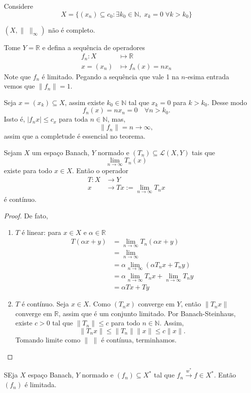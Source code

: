 \documentclass[portuguese]{article}
\theoremstyle{definition}
\newcommand{\R}{\mathbb{R}}
\newcommand{\N}{\mathbb{N}}
\begin{document}
	\begin{exemplo}
		Considere
		\[X=\{(x_n)\subseteq c_0:\exists k_0\in\N,\; x_k=0\;\forall k>k_0\}\]
		\begin{exer*}
			$(X,\|\;\|_\infty)$ não é completo.
		\end{exer*}
		Tome $Y=\R$ e defina a sequência de operadores
		\begin{align*}
			f_n:X&\mapsto\R\\
			x=(x_n)&\mapsto f_n(x)=nx_n
		\end{align*}
		Note que $f_n$ é limitado. Pegando a sequência que vale 1 na $n$-esima entrada vemos que $\| f_n\|=1$.
		
		Seja $x=(x_k)\subseteq X$, assim existe $k_0\in\N$ tal que $x_k=0$ para $k>k_0$. Desse modo
		\[f_n(x)=nx_n=0\quad\forall n>k_0.\]
		Issto é, $|f_nx|\leq c_x$ para toda $n\in\N$, mas,
		\[\| f_n\|=n\to\infty,\]
		assim que a completude é essencial no teorema.
	\end{exemplo}
	\begin{coro}
		Sejam $X$ um espaço Banach, $Y$ normado e $(T_n)\subseteq\mathcal{L}(X,Y)$ tais que
		\[\lim_{n\to\infty}T_n(x)\]
		existe para todo $x\in X$. Então o operador 
		\begin{align*}
			T:X&\to Y\\
			x&\to Tx:=\lim_{n\to \infty}T_nx
		\end{align*}
		é contínuo.
	\end{coro}
	\begin{proof}
		De fato,
		\begin{enumerate}
			\item $T$ é linear: para $x\in X$ e $\alpha\in\R$
			\begin{align*}
				T(\alpha x+y)&=\lim_{n\to \infty}T_n(\alpha x+y)\\
				&=\lim_{n\to\infty} \\
				&=\alpha\lim_{n\to\infty}(\alpha T_nx+T_ny)\\
				&=\alpha\lim_{n\to \infty}T_nx+\lim_{n\to \infty}T_ny\\
				&=\alpha Tx+Ty
			\end{align*}
			\item $T$ é contínuo. Seja $x\in X$. Como $(T_nx)$ converge em $Y$, então $\| T_nx\|$ converge em $\R$, assim que é um conjunto limitado. Por Banach-Steinhaus, existe $c>0$ tal que $\| T_n\|\leq c$ para todo $n\in\N$. Assim,
			\[\| T_nx\|\leq\| T_n\|\| x\|\leq c\| x\|.\]
			Tomando limite como $\|\;\|$ é contínua, terminhamos.
		\end{enumerate}
	\end{proof}
	\begin{coro}
		SEja $X$ espaço Banach, $Y$ normado e $(f_n)\subseteq X^*$ tal que $f_n\overset{w^*}{\longrightarrow}f\in X^*$. Então $(f_n)$ é limitada.
	\end{coro}
	
\end{document}
